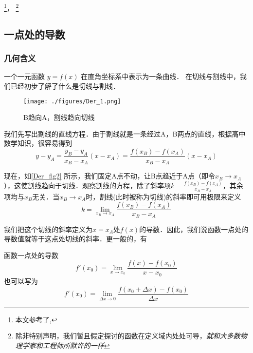 
\footnote{本文参考了\cite{同济高},\cite{Thomas}}，
\footnote{除非特别声明，我们暂且假定探讨的函数在定义域内处处可导，\textsl{就和大多数物理学家和工程师所默许的一样}}
\subsection{一点处的导数}
\subsubsection{几何含义}
一个一元函数 $y = f(x)$ 在直角坐标系中表示为一条曲线． 在切线与割线中，我们已经初步了解了什么是切线与割线．


\begin{figure}[ht]
\centering
\texttt{[image: ./figures/Der\_1.png]}
\caption{B趋向A，割线趋向切线} \label{Der_fig2}
\end{figure}

我们先写出割线的直线方程．由于割线就是一条经过A，B两点的直线，根据高中数学知识，很容易得到
\begin{equation}
y-y_A=\frac{y_B-y_A}{x_B-x_A}(x-x_A)=\frac{f(x_B)-f(x_A)}{x_B-x_A}(x-x_A)
\end{equation}

现在，如\autoref{Der_fig2} 所示，我们固定A点不动，让B点趋近于A点（即令$x_B\rightarrow x_A$），这使割线趋向于切线．观察割线的方程，除了斜率项$k=\frac{f(x_B)-f(x_A)}{x_B-x_A}$，其余项均与$x_B$无关．当$x_B\rightarrow x_A$时，割线(此时被称为切线)的斜率即可用极限来定义
\begin{equation}
k=\lim_{x_B\to x_A}\frac{f(x_B)-f(x_A)}{x_B-x_A}
\end{equation}

我们把这个切线的斜率定义为$x=x_A$处$f(x)$的导数．因此，我们说函数一点处的导数值就等于这点处切线的斜率．更一般的，有
\begin{definition}{函数一点处的导数}
\begin{equation}
f'(x_0)=\lim_{x\to x_0}\frac{f(x)-f(x_0)}{x-x_0}
\end{equation}
也可以写为
\begin{equation}\label{Der_eq2}
f'(x_0)=\lim_{\Delta x\to0}\frac{f(x_0+\Delta x)-f(x_0)}{\Delta x}
\end{equation}
\end{definition}

